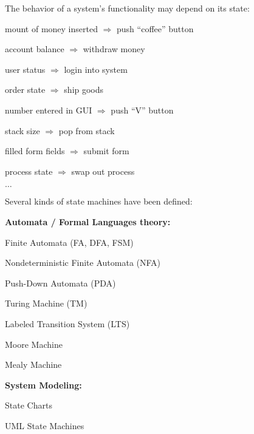 \begin{itemize*}
\item The behavior of a system's functionality may depend on its state:
\begin{itemize*}
	\item mount of money inserted $\Rightarrow$ push ``coffee'' button
	\item account balance $\Rightarrow$ withdraw money
	\item user status $\Rightarrow$ login into system
	\item order state $\Rightarrow$ ship goods
	\item number entered in GUI $\Rightarrow$ push ``V'' button
	\item stack size $\Rightarrow$ pop from stack
	\item filled form fields $\Rightarrow$ submit form
	\item process state $\Rightarrow$ swap out process
	\item $\dots$
\end{itemize*}
\item Several kinds of state machines have been defined:
\begin{itemize*}
	\item \textbf{Automata / Formal Languages theory:}
	\begin{itemize*}
		\item Finite Automata (FA, DFA, FSM)
		\item Nondeterministic Finite Automata (NFA)
		\item Push-Down Automata (PDA)
		\item Turing Machine (TM)
		\item Labeled Transition System (LTS)
		\item Moore Machine
		\item Mealy Machine
	\end{itemize*}
	\item \textbf{System Modeling:}
	\begin{itemize*}
		\item State Charts
		\item UML State Machines
	\end{itemize*}
\end{itemize*}
\end{itemize*}

